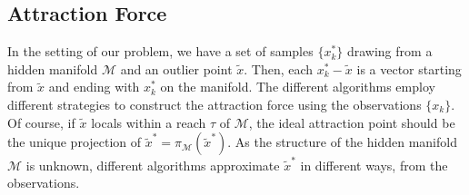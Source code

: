 \documentclass[aos,preprint]{imsart}
\theoremstyle{remark}
\begin{document}
\subsection{Attraction Force}
In the setting of our problem, we have a set of samples $\{x_k^*\}$ drawing from a hidden manifold $\mathcal M$ and an outlier point $\tilde{x}$. Then, each $x_k^*-\tilde{x}$ is a vector starting from $\tilde{x}$ and ending with $x_k^*$ on the manifold. The different algorithms employ different strategies to construct the attraction force using the observations $\{x_k\}$. Of course, if $\tilde{x}$ locals within a reach $\tau$ of $\mathcal M$, the ideal attraction point should be the unique projection of $\tilde{x}^*=\pi_{\mathcal M}( \tilde{x}^*)$. As the structure of the hidden manifold $\mathcal M$ is unknown, different algorithms approximate $\tilde{x}^*$ in different ways, from the observations.
\end{document}
